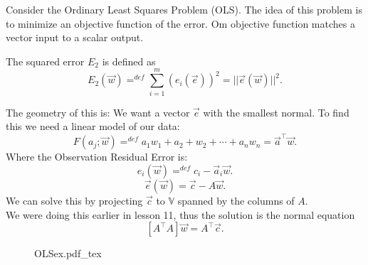 \documentclass[12pt]{book}
\newcommand{\incfig}[1]{%
    {#1.pdf_tex}
}
\begin{document}
Consider the Ordinary Least Squares Problem (OLS). 
The idea of this problem is to minimize an objective function of the error. 
Om objective function matches a vector input to a scalar output.

The squared error $E_2$ is defined as
 \[
E_2(\vec w) =^{def} \sum^m_{i=1}{(e_i(\vec e))}^2 = ||\vec e(\vec w) ||^2
.\] 

The geometry of this is: We want a vector $\vec e$ with the smallest normal.
To find this we need a linear model of our data:
 \[
F(a_j;\vec w)=^{def}  a_1w_1+a_2+w_2+\cdots+a_n w_n = \vec a^\top \vec w
.\] 
Where the Observation Residual Error is:
\[
e_i(\vec w)=^{def} c_i-\vec a_i \vec w
.\] 
\[
\vec e(\vec w) = \vec c-A\vec w
.\] 
We can solve this by projecting $\vec c$ to  $\mathbb{V}$ spanned by the columns of  $A$.\\
We were doing this earlier in lesson 11, thus the solution is the normal equation
 \[
[A^\top A]\vec w = A^\top \vec c
.\] 
\begin{figure}[h]
        \centering
        \incfig{OLSex}
\end{figure}
\end{document}
